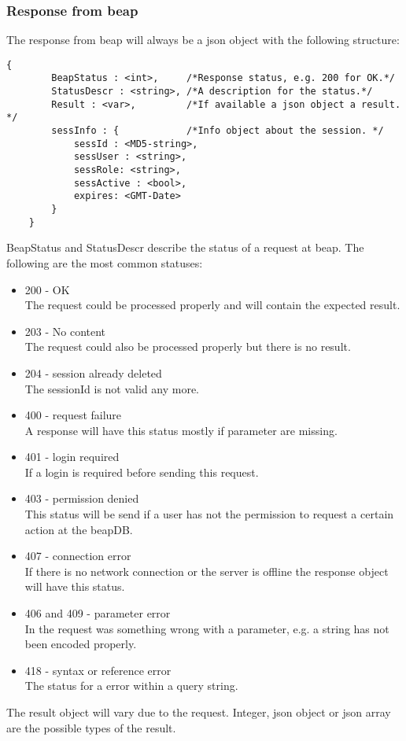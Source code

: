 \documentclass[12pt,a4paper,oneside]{report}
\begin{document}
\subsubsection{Response from beap}
The response from beap will always be a json object with the following structure: 
\lstset{language=JavaScript}
\begin{lstlisting}
{
		BeapStatus : <int>, 	/*Response status, e.g. 200 for OK.*/
		StatusDescr : <string>, /*A description for the status.*/
		Result : <var>,         /*If available a json object a result. */
		sessInfo : {			/*Info object about the session. */
			sessId : <MD5-string>,
			sessUser : <string>,
			sessRole: <string>,
			sessActive : <bool>,
			expires: <GMT-Date>  
		}
	}
\end{lstlisting}
\lstset{language=java}
BeapStatus and StatusDescr describe the status of a request at beap. The following are the most common statuses:
\begin{itemize}
\item{200 - OK}
\\The request could be processed properly and will contain the expected result.
\item{203 - No content}
\\The request could also be processed properly but there is no result.
\item{204 - session already deleted}
\\The sessionId is not valid any more.
\item{400 - request failure}
\\A response will have this status mostly if parameter are missing.
\item{401 - login required}
\\If a login is required before sending this request.
\item{403 - permission denied}
\\This status will be send if a user has not the permission to request a certain action at the beapDB.
\item{407 - connection error}
\\If there is no network connection or the server is offline the response object will have this status.
\item{406 and 409 - parameter error}
\\In the request was something wrong with a parameter, e.g. a string has not been encoded properly.
\item{418 - syntax or reference error}
\\The status for a error within a query string.
\end{itemize}
The result object will vary due to the request. Integer, json object or json array are the possible types of the result. 
\end{document}
